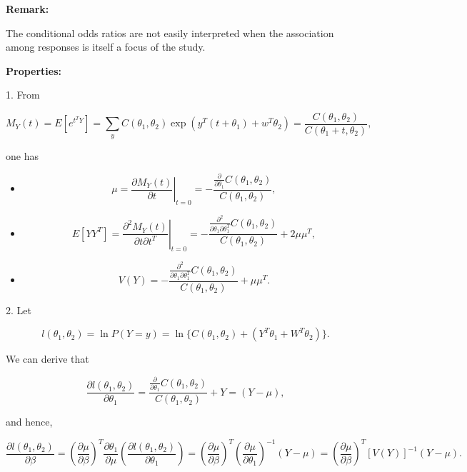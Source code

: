 \documentclass[UTF8,a4paper,10pt]{article}
\begin{document}
\begin{Problem}[]{}
\textbf{Remark: }

The conditional odds ratios are not easily interpreted when the association among responses is itself a focus of the study.

\textbf{Properties: }

1. From 

\[M_Y(t)=E\left[e^{t^T Y}\right]=\sum_y C\left(\theta_1, \theta_2\right) \exp \left(y^T\left(t+\theta_1\right)+w^T \theta_2\right)=\frac{C\left(\theta_1, \theta_2\right)}{C\left(\theta_1+t, \theta_2\right)},\] 

one has

\begin{itemize}
  \item \[\mu=\left.\frac{\partial M_Y(t)}{\partial t}\right|_{t=0}=-\dfrac{\frac{\partial}{\partial \theta_1} C\left(\theta_1, \theta_2\right)}{C\left(\theta_1, \theta_2\right)},\]
  \item \[E\left[Y Y^T\right]=\left.\dfrac{\partial^2 M_Y(t)}{\partial t \partial t^T}\right|_{t=0}=-\frac{\frac{\partial^2}{\partial \theta_1 \partial \theta_1^T} C\left(\theta_1, \theta_2\right)}{C\left(\theta_1, \theta_2\right)}+2 \mu \mu^T,\]
  \item \[V(Y)=-\dfrac{\frac{\partial^2}{\partial \theta_1 \partial \theta_1^T} C\left(\theta_1, \theta_2\right)}{C\left(\theta_1, \theta_2\right)}+\mu \mu^T.\]
\end{itemize}

2. Let 

\[l(\theta_1,\theta_2) = \ln P(Y=y) = \ln \{C(\theta_1,\theta_2)+(Y^T\theta_1 +W^T \theta_2)\}.\]

We can derive that

\[\dfrac{\partial l\left(\theta_1, \theta_2\right)}{\partial \theta_1}=\dfrac{\frac{\partial}{\partial \theta_1} C\left(\theta_1, \theta_2\right)}{C\left(\theta_1, \theta_2\right)}+Y=(Y-\mu),\]

 and hence,
 
$$
\frac{\partial l\left(\theta_1, \theta_2\right)}{\partial \beta}=\left(\frac{\partial \mu}{\partial \beta}\right)^T \frac{\partial \theta_1}{\partial \mu}\left(\frac{\partial l\left(\theta_1, \theta_2\right)}{\partial \theta_1}\right)=\left(\frac{\partial \mu}{\partial \beta}\right)^T\left(\frac{\partial \mu}{\partial \theta_1}\right)^{-1}(Y-\mu)=\left(\frac{\partial \mu}{\partial \beta}\right)^T[V(Y)]^{-1}(Y-\mu) .
$$
\end{Problem}
\end{document}
